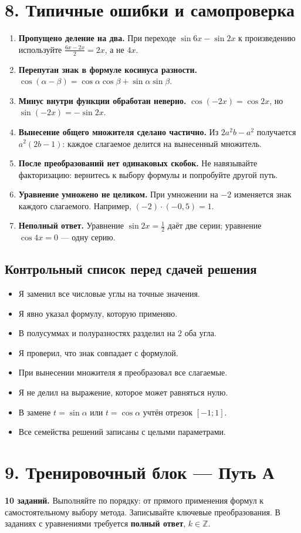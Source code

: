 \documentclass[a4paper,12pt]{article}
\newcommand{\checkitem}{\item[$\square$]}
\newcommand{\heading}[1]{\section*{\color{darkaccent}#1}}
\newcommand{\subheading}[1]{\subsection*{\color{accent}#1}}
\begin{document}
\heading{8. Типичные ошибки и самопроверка}
\begin{enumerate}[label=\textbf{\arabic*.}]
\item \textbf{Пропущено деление на два.}
При переходе $\sin6x-\sin2x$ к произведению используйте
$\frac{6x-2x}2=2x$, а не $4x$.
\item \textbf{Перепутан знак в формуле косинуса разности.}
$\cos(\alpha-\beta)=\cos\alpha\cos\beta+\sin\alpha\sin\beta$.
\item \textbf{Минус внутри функции обработан неверно.}
$\cos(-2x)=\cos2x$, но $\sin(-2x)=-\sin2x$.
\item \textbf{Вынесение общего множителя сделано частично.}
Из $2a^2b-a^2$ получается $a^2(2b-1)$: каждое слагаемое делится на вынесенный множитель.
\item \textbf{После преобразований нет одинаковых скобок.}
Не навязывайте факторизацию: вернитесь к выбору формулы и попробуйте другой путь.
\item \textbf{Уравнение умножено не целиком.}
При умножении на $-2$ изменяется знак каждого слагаемого. Например, $(-2)\cdot(-0{,}5)=1$.
\item \textbf{Неполный ответ.}
Уравнение $\sin2x=\frac12$ даёт две серии; уравнение $\cos4x=0$ --- одну серию.
\end{enumerate}

\subheading{Контрольный список перед сдачей решения}
\begin{itemize}
\checkitem Я заменил все числовые углы на точные значения.
\checkitem Я явно указал формулу, которую применяю.
\checkitem В полусуммах и полуразностях разделил на $2$ оба угла.
\checkitem Я проверил, что знак совпадает с формулой.
\checkitem При вынесении множителя я преобразовал все слагаемые.
\checkitem Я не делил на выражение, которое может равняться нулю.
\checkitem В замене $t=\sin\alpha$ или $t=\cos\alpha$ учтён отрезок $[-1;1]$.
\checkitem Все семейства решений записаны с целыми параметрами.
\end{itemize}

\clearpage
\heading{9. Тренировочный блок --- Путь А}
\textbf{10 заданий.} Выполняйте по порядку: от прямого применения формул к самостоятельному выбору метода. Записывайте ключевые преобразования. В заданиях с уравнениями требуется \textbf{полный ответ}, $k\in\mathbb Z$.
\end{document}
